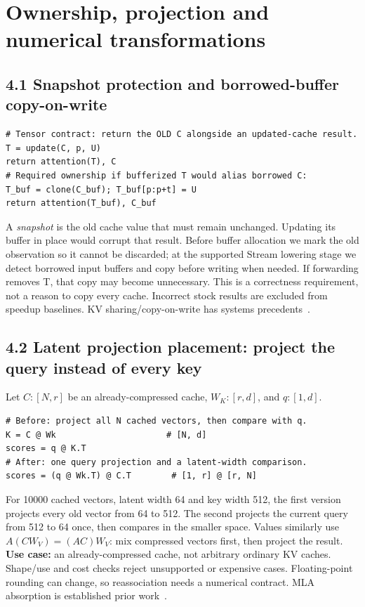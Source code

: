 \documentclass[10pt,a4paper]{article}
\begin{document}
\newpage
\section{Ownership, projection and numerical transformations}

\subsection*{4.1 Snapshot protection and borrowed-buffer copy-on-write}
\begin{lstlisting}
# Tensor contract: return the OLD C alongside an updated-cache result.
T = update(C, p, U)
return attention(T), C
# Required ownership if bufferized T would alias borrowed C:
T_buf = clone(C_buf); T_buf[p:p+t] = U
return attention(T_buf), C_buf
\end{lstlisting}
A \emph{snapshot} is the old cache value that must remain unchanged. Updating its buffer in place would corrupt that result. Before buffer allocation we mark the old observation so it cannot be discarded; at the supported Stream lowering stage we detect borrowed input buffers and copy before writing when needed. If forwarding removes T, that copy may become unnecessary. This is a correctness requirement, not a reason to copy every cache. Incorrect stock results are excluded from speedup baselines. KV sharing/copy-on-write has systems precedents~\cite{paged,forkkv}.

\subsection*{4.2 Latent projection placement: project the query instead of every key}
Let $C:[N,r]$ be an already-compressed cache, $W_K:[r,d]$, and $q:[1,d]$.
\begin{lstlisting}
# Before: project all N cached vectors, then compare with q.
K = C @ Wk                      # [N, d]
scores = q @ K.T
# After: one query projection and a latent-width comparison.
scores = (q @ Wk.T) @ C.T        # [1, r] @ [r, N]
\end{lstlisting}
For 10000 cached vectors, latent width 64 and key width 512, the first version projects every old vector from 64 to 512. The second projects the current query from 512 to 64 once, then compares in the smaller space. Values similarly use $A(CW_V)=(AC)W_V$: mix compressed vectors first, then project the result. \textbf{Use case:} an already-compressed cache, not arbitrary ordinary KV caches. Shape/use and cost checks reject unsupported or expensive cases. Floating-point rounding can change, so reassociation needs a numerical contract. MLA absorption is established prior work~\cite{deepseek}.
\end{document}
